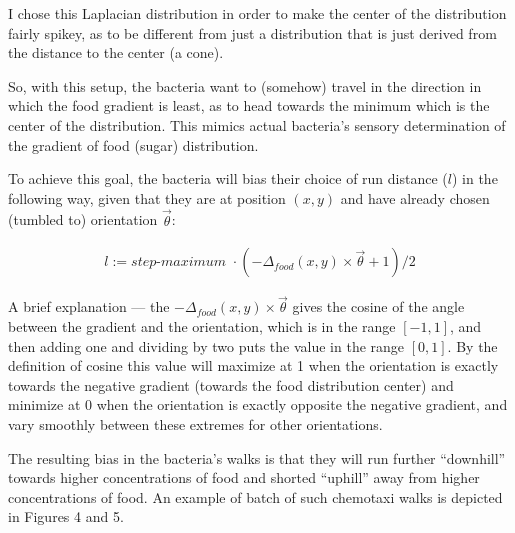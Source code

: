 \documentclass{article}
\begin{document}
  I chose this Laplacian distribution in order to make the center of the distribution fairly spikey, as to be different from just a distribution that is just derived from the distance to the center (a cone).





  So, with this setup, the bacteria want to (somehow) travel in the direction in which the food gradient is least, as to head towards the minimum which is the center of the distribution. This mimics actual bacteria's sensory determination of the gradient of food (sugar) distribution.





  To achieve this goal, the bacteria will bias their choice of run distance ($  l  $) in the following way, given that they are at position $  (x,y)  $ and have already chosen (tumbled to) orientation $  \vec{\theta}  $:


\begin{align*} 
  l := \textit{step-maximum } \cdot (-\Delta_{food}(x,y) \times \vec{\theta} + 1) / 2
 \end{align*} \vspace*{0.1cm}


  A brief explanation --- the $  -\Delta_{food}(x,y) \times \vec{\theta}  $ gives the cosine of the angle between the gradient and the orientation, which is in the range $  [-1,1]  $, and then adding one and dividing by two puts the value in the range $  [0,1]  $. By the definition of cosine this value will maximize at 1 when the orientation is exactly towards the negative gradient (towards the food distribution center) and minimize at 0 when the orientation is exactly opposite the negative gradient, and vary smoothly between these extremes for other orientations.





  The resulting bias in the bacteria's walks is that they will run further ``downhill'' towards higher concentrations of food and shorted ``uphill'' away from higher concentrations of food. An example of batch of such chemotaxi walks is depicted in Figures 4 and 5.
\end{document}
